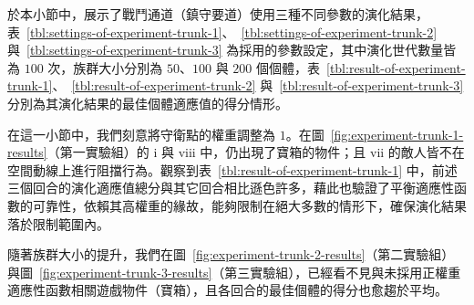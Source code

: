 於本小節中，展示了戰鬥通道（鎮守要道）使用三種不同參數的演化結果，表~\ref{tbl:settings-of-experiment-trunk-1}、~\ref{tbl:settings-of-experiment-trunk-2} 與~\ref{tbl:settings-of-experiment-trunk-3} 為採用的參數設定，其中演化世代數量皆為 $100$ 次，族群大小分別為 $50$、$100$ 與 $200$ 個個體，表~\ref{tbl:result-of-experiment-trunk-1}、~\ref{tbl:result-of-experiment-trunk-2} 與~\ref{tbl:result-of-experiment-trunk-3} 分別為其演化結果的最佳個體適應值的得分情形。

在這一小節中，我們刻意將守衛點的權重調整為 $1$。在圖~\ref{fig:experiment-trunk-1-results}（第一實驗組）的 i 與 viii 中，仍出現了寶箱的物件；且 vii 的敵人皆不在空間動線上進行阻擋行為。觀察到表~\ref{tbl:result-of-experiment-trunk-1} 中，前述三個回合的演化適應值總分與其它回合相比遜色許多，藉此也驗證了平衡適應性函數的可靠性，依賴其高權重的緣故，能夠限制在絕大多數的情形下，確保演化結果落於限制範圍內。

隨著族群大小的提升，我們在圖~\ref{fig:experiment-trunk-2-results}（第二實驗組）與圖~\ref{fig:experiment-trunk-3-results}（第三實驗組），已經看不見與未採用正權重適應性函數相關遊戲物件（寶箱），且各回合的最佳個體的得分也愈趨於平均。


